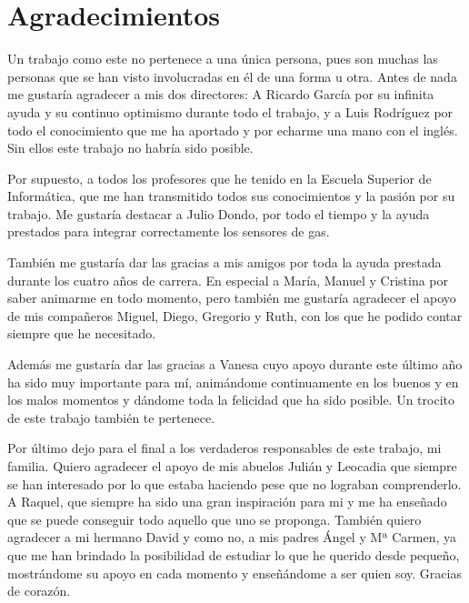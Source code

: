 \chapter{Agradecimientos}

Un trabajo como este no pertenece a una única persona, pues son muchas las personas que se han visto involucradas en él de una forma u otra. Antes de nada me gustaría agradecer a mis dos directores: A Ricardo García por su infinita ayuda y su continuo optimismo durante todo el trabajo, y a Luis Rodríguez por todo el conocimiento que me ha aportado y por echarme una mano con el inglés. Sin ellos este trabajo no habría sido posible.

Por supuesto, a todos los profesores que he tenido en la Escuela Superior de Informática, que me han transmitido todos sus conocimientos y la pasión por su trabajo. Me gustaría destacar a Julio Dondo, por todo el tiempo y la ayuda prestados para integrar correctamente los sensores de gas. 

También me gustaría dar las gracias a mis amigos por toda la ayuda prestada durante los cuatro años de carrera. En especial a María, Manuel y Cristina por saber animarme en todo momento, pero también me gustaría agradecer el apoyo de mis compañeros Miguel, Diego, Gregorio y Ruth, con los que he podido contar siempre que he necesitado.

Además me gustaría dar las gracias a Vanesa cuyo apoyo durante este último año ha sido muy importante para mí, animándome continuamente en los buenos y en los malos momentos y dándome toda la felicidad que ha sido posible. Un trocito de este trabajo también te pertenece.

Por último dejo para el final a los verdaderos responsables de este trabajo, mi familia. Quiero agradecer el apoyo de mis abuelos Julián y Leocadia que siempre se han interesado por lo que estaba haciendo pese que no lograban comprenderlo. A Raquel, que siempre ha sido una gran inspiración para mi y me ha enseñado que se puede conseguir todo aquello que uno se proponga. También quiero agradecer a mi hermano David y como no, a mis padres Ángel y Mª Carmen, ya que me han brindado la posibilidad de estudiar lo que he querido desde pequeño, mostrándome su apoyo en cada momento y enseñándome a ser quien soy. Gracias de corazón.

